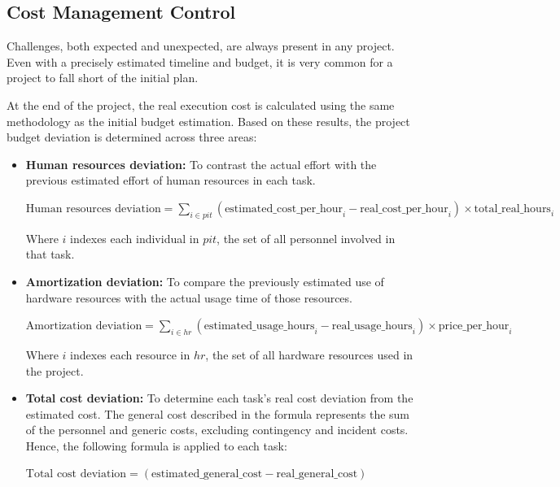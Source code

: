 \subsection{Cost Management Control}
\label{sec:management-control}

Challenges, both expected and unexpected, are always present in any project. Even with a precisely estimated timeline and budget, it is very common for a project to fall short of the initial plan. 

At the end of the project, the real execution cost is calculated using the same methodology as the initial budget estimation. Based on these results, the project budget deviation is determined across three areas:
 

\begin{itemize} [leftmargin=0.75cm, noitemsep, label=$\bullet$]
    \item \textbf{Human resources deviation:} To contrast the actual effort with the previous estimated effort of human resources in each task.
    
    \vspace{5pt}
    {\footnotesize
    \centerline{$\displaystyle
    \text{Human resources deviation} =
    \sum_{i \in pit} 
    \left(
    \text{estimated\_cost\_per\_hour}_i - \text{real\_cost\_per\_hour}_i
    \right) 
    \times
    \text{total\_real\_hours}_i
    $}
    }

    {\footnotesize
        Where $i$ indexes each individual in $pit$, the set of all personnel involved in that task.
    }
    
    \item \textbf{Amortization deviation:} To compare the previously estimated use of hardware resources with the actual usage time of those resources.
    
    \vspace{5pt}
    {\footnotesize
    \centerline{$\displaystyle
    \text{Amortization deviation} =
    \sum_{i \in hr} 
    \left(
    \text{estimated\_usage\_hours}_i - \text{real\_usage\_hours}_i
    \right) 
    \times
    \text{price\_per\_hour}_i
    $}
    }
    
    {\footnotesize
        Where $i$ indexes each resource in $hr$, the set of all hardware resources used in the project.
    }

    \item \textbf{Total cost deviation:} To determine each task's real cost deviation from the estimated cost. The general cost described in the formula represents the sum of the personnel and generic costs, excluding contingency and incident costs. Hence, the following formula is applied to each task:

    \vspace{5pt}
    {\small
    \centerline{$\displaystyle
    \text{Total cost deviation} =
    \left(
    \text{estimated\_general\_cost} - \text{real\_general\_cost}
    \right) 
    $}
    }
    
\end{itemize}

